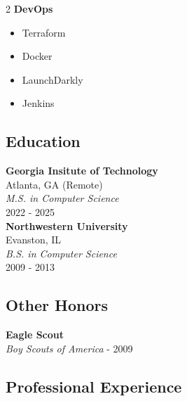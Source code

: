 \documentclass[10pt]{article}
\begin{document}
\begin{paracol}{2}
    \noindent \textbf{DevOps}
    \begin{itemize}
        \item Terraform
        \item Docker
        \item LaunchDarkly
        \item Jenkins
    \end{itemize}

    \subsection*{Education}
    \textbf{Georgia Insitute of Technology} \\
    Atlanta, GA (Remote) \\
    \textit{M.S. in Computer Science}  \\
    {\footnotesize{2022 - 2025}} \\


    \noindent \textbf{Northwestern University} \\
    Evanston, IL \\
    \textit{B.S. in Computer Science}  \\
    {\footnotesize{2009 - 2013}}

    \subsection*{Other Honors}
    \textbf{Eagle Scout} \\
    \textit{Boy Scouts of America} - {\footnotesize{2009}}

    \switchcolumn

    \subsection*{Professional Experience}


\end{paracol}
\end{document}
